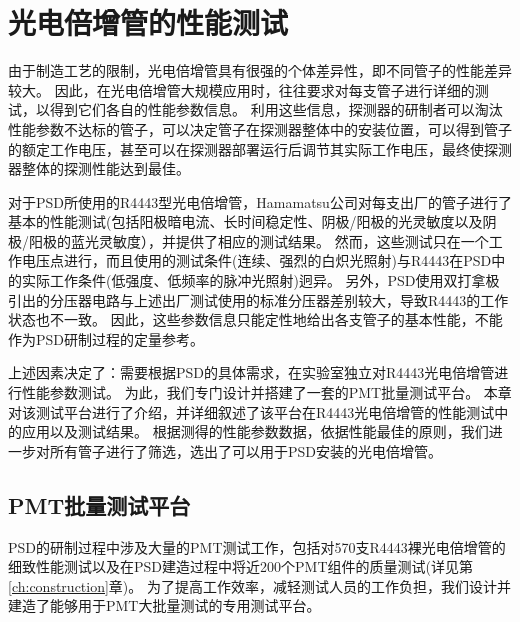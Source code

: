 \chapter{光电倍增管的性能测试}
\label{ch:pmt_test}
由于制造工艺的限制，光电倍增管具有很强的个体差异性，即不同管子的性能差异较大。
因此，在光电倍增管大规模应用时，往往要求对每支管子进行详细的测试，以得到它们各自的性能参数信息。
利用这些信息，探测器的研制者可以淘汰性能参数不达标的管子，可以决定管子在探测器整体中的安装位置，可以得到管子的额定工作电压，甚至可以在探测器部署运行后调节其实际工作电压，最终使探测器整体的探测性能达到最佳。

对于PSD所使用的R4443型光电倍增管，Hamamatsu公司对每支出厂的管子进行了基本的性能测试(包括阳极暗电流、长时间稳定性、阴极/阳极的光灵敏度以及阴极/阳极的蓝光灵敏度），并提供了相应的测试结果。
然而，这些测试只在一个工作电压点进行，而且使用的测试条件(连续、强烈的白炽光照射)与R4443在PSD中的实际工作条件(低强度、低频率的脉冲光照射)迥异。
另外，PSD使用双打拿极引出的分压器电路与上述出厂测试使用的标准分压器差别较大，导致R4443的工作状态也不一致。
因此，这些参数信息只能定性地给出各支管子的基本性能，不能作为PSD研制过程的定量参考。

上述因素决定了：需要根据PSD的具体需求，在实验室独立对R4443光电倍增管进行性能参数测试。
为此，我们专门设计并搭建了一套的PMT批量测试平台。
本章对该测试平台进行了介绍，并详细叙述了该平台在R4443光电倍增管的性能测试中的应用以及测试结果。
根据测得的性能参数数据，依据性能最佳的原则，我们进一步对所有管子进行了筛选，选出了可以用于PSD安装的光电倍增管。

\section{PMT批量测试平台}
\label{sec:pmt_test:testbench}
PSD的研制过程中涉及大量的PMT测试工作，包括对570支R4443裸光电倍增管的细致性能测试以及在PSD建造过程中将近200个PMT组件的质量测试(详见第\ref{ch:construction}章)。
为了提高工作效率，减轻测试人员的工作负担，我们设计并建造了能够用于PMT大批量测试的专用测试平台。

